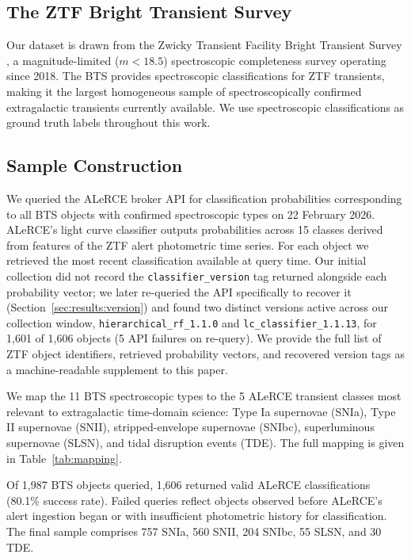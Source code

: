 \subsection{The ZTF Bright Transient Survey}
\label{sec:data:bts}

Our dataset is drawn from the Zwicky Transient Facility Bright Transient 
Survey \citep[BTS;][]{Fremling2020, Perley2020}, a magnitude-limited 
($m < 18.5$) spectroscopic completeness survey operating since 2018. 
The BTS provides spectroscopic classifications for ZTF transients, 
making it the largest homogeneous sample of spectroscopically confirmed 
extragalactic transients currently available. We use spectroscopic 
classifications as ground truth labels throughout this work.

\subsection{Sample Construction}
\label{sec:data:sample}

We queried the ALeRCE broker API \citep{Forster2021} for classification
probabilities corresponding to all BTS objects with confirmed
spectroscopic types on 22 February 2026. ALeRCE's light curve classifier
\citep{Sanchez-Saez2021} outputs probabilities across 15 classes derived
from features of the ZTF alert photometric time series. For each object
we retrieved the most recent classification available at query time.
Our initial collection did not record the \texttt{classifier\_version}
tag returned alongside each probability vector; we later re-queried the
API specifically to recover it (Section~\ref{sec:results:version}) and
found two distinct versions active across our collection window,
\texttt{hierarchical\_rf\_1.1.0} and \texttt{lc\_classifier\_1.1.13}, for
1,601 of 1,606 objects (5 API failures on re-query). We provide the full
list of ZTF object identifiers, retrieved probability vectors, and
recovered version tags as a machine-readable supplement to this paper.

We map the 11 BTS spectroscopic types to the 5 ALeRCE transient classes 
most relevant to extragalactic time-domain science: Type Ia supernovae 
(SNIa), Type II supernovae (SNII), stripped-envelope supernovae (SNIbc), 
superluminous supernovae (SLSN), and tidal disruption events (TDE). 
The full mapping is given in Table~\ref{tab:mapping}.

Of 1,987 BTS objects queried, 1,606 returned valid ALeRCE classifications 
(80.1\% success rate). Failed queries reflect objects observed before 
ALeRCE's alert ingestion began or with insufficient photometric history 
for classification. The final sample comprises 757 SNIa, 560 SNII, 
204 SNIbc, 55 SLSN, and 30 TDE.

